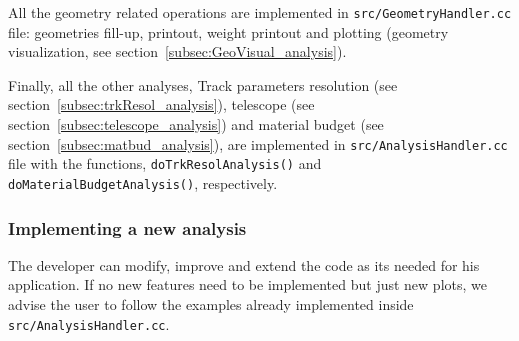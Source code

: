 All the geometry related operations are implemented in {\tt src/GeometryHandler.cc} file: geometries fill-up, printout, weight printout and plotting (geometry visualization, see 
section~\ref{subsec:GeoVisual_analysis}).

Finally, all the other analyses, Track parameters resolution (see section~\ref{subsec:trkResol_analysis}), telescope (see section~\ref{subsec:telescope_analysis}) and material budget 
(see section~\ref{subsec:matbud_analysis}), are implemented in {\tt src/AnalysisHandler.cc} file with the functions, {\tt doTrkResolAnalysis()} and {\tt doMaterialBudgetAnalysis()}, 
respectively.

\subsubsection{Implementing a new analysis}

The developer can modify, improve and extend the code as its needed for his application. If no new features need to be implemented but just new plots, we advise the user to follow the 
examples already implemented inside {\tt src/AnalysisHandler.cc}.


